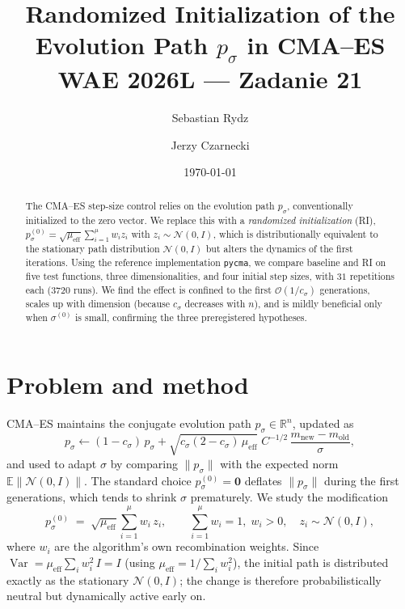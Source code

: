 \documentclass[11pt]{article}
\title{Randomized Initialization of the Evolution Path $p_\sigma$ in CMA--ES\\[2pt]
\large WAE 2026L --- Zadanie 21}
\author{Sebastian Rydz \and Jerzy Czarnecki}
\date{\today}
\begin{document}
\maketitle

\begin{abstract}
The CMA--ES step-size control relies on the evolution path $p_\sigma$, conventionally
initialized to the zero vector. We replace this with a \emph{randomized initialization}
(RI), $p_\sigma^{(0)}=\sqrt{\mu_{\text{eff}}}\sum_{i=1}^{\mu} w_i z_i$ with $z_i\sim\mathcal
N(0,I)$, which is distributionally equivalent to the stationary path distribution
$\mathcal N(0,I)$ but alters the dynamics of the first iterations. Using the reference
implementation \texttt{pycma}, we compare baseline and RI on five test functions, three
dimensionalities, and four initial step sizes, with $31$ repetitions each ($3720$ runs).
We find the effect is confined to the first $\mathcal O(1/c_\sigma)$ generations, scales up
with dimension (because $c_\sigma$ decreases with $n$), and is mildly beneficial only when
$\sigma^{(0)}$ is small, confirming the three preregistered hypotheses.
\end{abstract}

\section{Problem and method}

CMA--ES maintains the conjugate evolution path $p_\sigma\in\mathbb R^n$, updated as
\begin{equation}
p_\sigma \leftarrow (1-c_\sigma)\,p_\sigma
  + \sqrt{c_\sigma(2-c_\sigma)\,\mu_{\text{eff}}}\; C^{-1/2}\,\frac{m_{\text{new}}-m_{\text{old}}}{\sigma},
\end{equation}
and used to adapt $\sigma$ by comparing $\lVert p_\sigma\rVert$ with the expected norm
$\mathbb E\lVert\mathcal N(0,I)\rVert$. The standard choice $p_\sigma^{(0)}=\mathbf 0$
deflates $\lVert p_\sigma\rVert$ during the first generations, which tends to shrink
$\sigma$ prematurely. We study the modification
\begin{equation}
\label{eq:ri}
p_\sigma^{(0)} \;=\; \sqrt{\mu_{\text{eff}}}\sum_{i=1}^{\mu} w_i\,z_i,
\qquad \sum_{i=1}^{\mu} w_i = 1,\; w_i>0,\quad z_i\sim\mathcal N(0,I),
\end{equation}
where $w_i$ are the algorithm's own recombination weights. Since
$\operatorname{Var}=\mu_{\text{eff}}\sum_i w_i^2\, I = I$ (using
$\mu_{\text{eff}}=1/\sum_i w_i^2$), the initial path is distributed exactly as the
stationary $\mathcal N(0,I)$; the change is therefore probabilistically neutral but
dynamically active early on.
\end{document}
